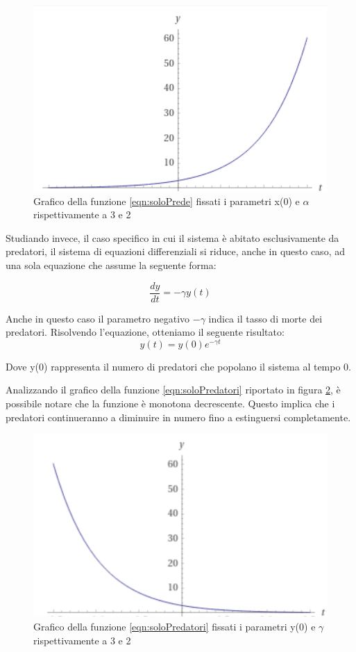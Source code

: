 \documentclass[11pt]{article}
\begin{document}
\begin{figure}[h]
    \centering
    \includegraphics[scale = 1]{plotSoloPrede.PNG}
    \caption{Grafico della funzione \eqref{eqn:soloPrede} fissati i parametri x(0) e $\alpha$ rispettivamente a 3 e 2}
    \label{figPlotLotkaVolterraSoloPrede}
\end{figure}

\noindent Studiando invece, il caso specifico in cui il sistema è abitato esclusivamente da predatori, il sistema di equazioni differenziali si riduce, anche in questo caso, ad una sola equazione che assume la seguente forma: 

\[
    \frac{dy}{dt} = -\gamma y(t) 
\]

Anche in questo caso il parametro negativo $-\gamma$ indica il tasso di morte dei predatori. 
Risolvendo l'equazione, otteniamo il seguente risultato:
\begin{equation}\label{eqn:soloPredatori}
    y(t) = y(0)e^{-\gamma t}
\end{equation}

\noindent Dove y(0) rappresenta il numero di predatori che popolano il sistema al tempo 0.

\noindent Analizzando il grafico della funzione \eqref{eqn:soloPredatori} riportato in figura \ref{figPlotLotkaVolterraSoloPredatori}, è possibile notare che la funzione è monotona decrescente. Questo implica che i predatori continueranno a diminuire in numero fino a estinguersi completamente. 

\begin{figure}[h]
    \centering
    \includegraphics[scale = 1]{plotSoloPredatori.PNG}
    \caption{Grafico della funzione \eqref{eqn:soloPredatori} fissati i parametri y(0) e $\gamma$ rispettivamente a 3 e 2}
    \label{figPlotLotkaVolterraSoloPredatori}
\end{figure}
\end{document}
